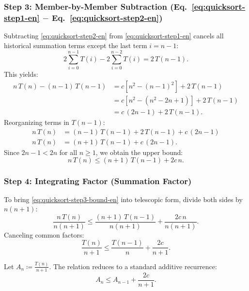 \subsubsection{Step 3: Member-by-Member Subtraction (Eq.~\ref{eq:quicksort-step1-en} $-$ Eq.~\ref{eq:quicksort-step2-en})}
Subtracting \autoref{eq:quicksort-step2-en} from \autoref{eq:quicksort-step1-en} cancels all historical summation terms except the last term $i = n - 1$:
\begin{equation}
  2 \sum_{i=0}^{n-1} T(i) - 2 \sum_{i=0}^{n-2} T(i) = 2 \, T(n - 1).
\end{equation}
This yields:
\begin{align}
  n \, T(n) - (n - 1) \, T(n - 1) &= c \left[ n^2 - (n - 1)^2 \right] + 2 \, T(n - 1) \\
  &= c \left[ n^2 - (n^2 - 2n + 1) \right] + 2 \, T(n - 1) \\
  &= c \, (2n - 1) + 2 \, T(n - 1).
\end{align}
Reorganizing terms in $T(n - 1)$:
\begin{align}
  n \, T(n) &= (n - 1) \, T(n - 1) + 2 \, T(n - 1) + c \, (2n - 1) \\
  n \, T(n) &= (n + 1) \, T(n - 1) + c \, (2n - 1).
\end{align}
Since $2n - 1 < 2n$ for all $n \ge 1$, we obtain the upper bound:
\begin{equation}
  n \, T(n) \le (n + 1) \, T(n - 1) + 2c \, n.
  \label{eq:quicksort-step3-bound-en}
\end{equation}

\subsubsection{Step 4: Integrating Factor (Summation Factor)}
To bring \autoref{eq:quicksort-step3-bound-en} into telescopic form, divide both sides by $n (n + 1)$:
\begin{equation}
  \frac{n \, T(n)}{n (n + 1)} \le \frac{(n + 1) \, T(n - 1)}{n (n + 1)} + \frac{2c \, n}{n (n + 1)}.
\end{equation}
Canceling common factors:
\begin{equation}
  \frac{T(n)}{n + 1} \le \frac{T(n - 1)}{n} + \frac{2c}{n + 1}.
  \label{eq:quicksort-integrating-factor-en}
\end{equation}

Let $A_n \coloneqq \frac{T(n)}{n + 1}$. The relation reduces to a standard additive recurrence:
\begin{equation}
  A_n \le A_{n - 1} + \frac{2c}{n + 1}.
\end{equation}

